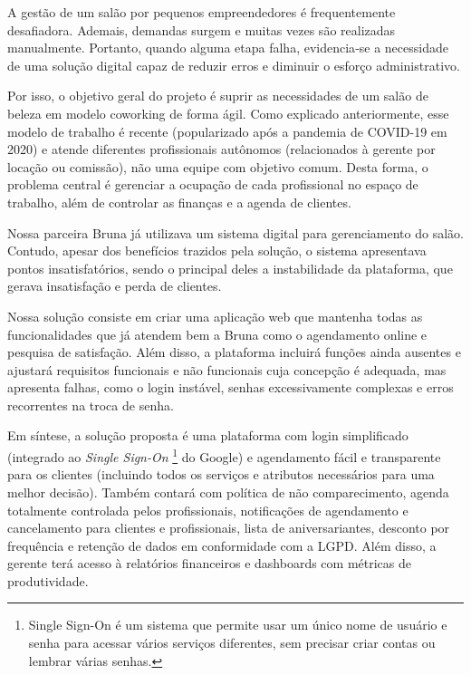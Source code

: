 
A gestão de um salão por pequenos empreendedores é frequentemente desafiadora. Ademais, demandas surgem e muitas vezes são realizadas manualmente. Portanto, quando alguma etapa falha, evidencia‐se a necessidade de uma solução digital capaz de reduzir erros e diminuir o esforço administrativo.

Por isso, o objetivo geral do projeto é suprir as necessidades de um salão de beleza em modelo coworking de forma ágil. Como explicado anteriormente, esse modelo de trabalho é recente (popularizado após a pandemia de COVID-19 em 2020) e atende diferentes profissionais autônomos (relacionados à gerente por locação ou comissão), não uma equipe com objetivo comum. Desta forma, o problema central é gerenciar a ocupação de cada profissional no espaço de trabalho, além de controlar as finanças e a agenda de clientes.

Nossa parceira Bruna já utilizava um sistema digital para gerenciamento do salão. Contudo, apesar dos benefícios trazidos pela solução, o sistema apresentava pontos insatisfatórios, sendo o principal deles a instabilidade da plataforma, que gerava insatisfação e perda de clientes.

Nossa solução consiste em criar uma aplicação web que mantenha todas as funcionalidades que já atendem bem a Bruna como o agendamento online e pesquisa de satisfação. Além disso, a plataforma incluirá funções ainda ausentes e ajustará requisitos funcionais e não funcionais cuja concepção é adequada, mas apresenta falhas, como o login instável, senhas excessivamente complexas e erros recorrentes na troca de senha.

Em síntese, a solução proposta é uma plataforma com login simplificado (integrado ao \emph{Single Sign-On} \footnote{Single Sign-On é um sistema que permite usar um único nome de usuário e senha para acessar vários serviços diferentes, sem precisar criar contas ou lembrar várias senhas.} do Google) e agendamento fácil e transparente para os clientes (incluindo todos os serviços e atributos necessários para uma melhor decisão). Também contará com política de não comparecimento, agenda totalmente controlada pelos profissionais, notificações de agendamento e cancelamento para clientes e profissionais, lista de aniversariantes, desconto por frequência e retenção de dados em conformidade com a LGPD. Além disso, a gerente terá acesso à relatórios financeiros e dashboards com métricas de produtividade.
